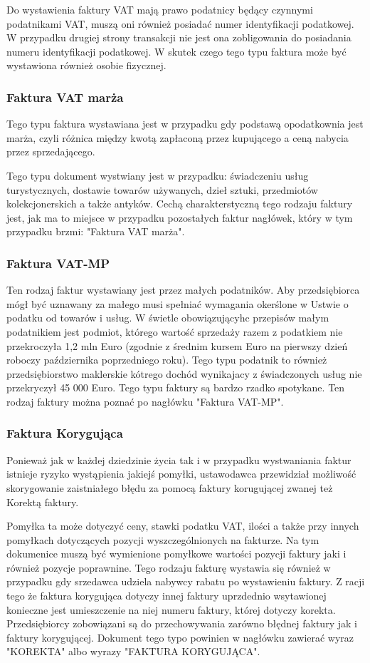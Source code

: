 \documentclass[12pt, a4paper]{article}
\begin{document}
Do wystawienia faktury VAT mają prawo podatnicy będący czynnymi podatnikami VAT,
muszą oni również posiadać numer identyfikacji podatkowej. W przypadku drugiej
strony transakcji nie jest ona zobligowania do posiadania numeru identyfikacji
podatkowej. W skutek czego tego typu faktura może być wystawiona również osobie
fizycznej.


\subsubsection{Faktura VAT marża}
Tego typu faktura wystawiana jest w przypadku gdy podstawą opodatkownia jest
marża, czyli różnica między kwotą zapłaconą przez kupującego a ceną nabycia
przez sprzedającego.


Tego typu dokument wystwiany jest w przypadku: świadczeniu usług
turystycznych, dostawie towarów używanych, dzieł sztuki, przedmiotów
kolekcjonerskich a także antyków. Cechą charakterstyczną tego rodzaju faktury
jest, jak ma to miejsce w przypadku pozostałych faktur nagłówek, który w tym
przypadku brzmi: "Faktura VAT marża".
\subsubsection{Faktura VAT-MP}
Ten rodzaj faktur wystawiany jest przez małych podatników. Aby przedsiębiorca
mógł być uznawany za małego musi spełniać wymagania okerślone w Ustwie o
podatku od towarów i usług. W świetle obowiązującyhc przepisów małym
podatnikiem jest podmiot, którego wartość sprzedaży razem z podatkiem nie
przekroczyła 1,2 mln Euro (zgodnie z średnim kursem Euro na pierwszy dzień
roboczy października poprzedniego roku). Tego typu podatnik to również
przedsiębiorstwo maklerskie kótrego dochód wynikajacy z świadczonych usług nie
przekryczył 45 000 Euro. Tego typu faktury są bardzo rzadko spotykane. Ten
rodzaj faktury można poznać po nagłówku "Faktura VAT-MP".
\subsubsection{Faktura Korygująca}
Ponieważ jak w każdej dziedzinie życia tak i w przypadku wystwaniania faktur
istnieje ryzyko wystąpienia jakiejś pomyłki, ustawodawca przewidział możliwość
skorygowanie zaistniałego błędu za pomocą faktury korugującej zwanej też Korektą
faktury.


Pomyłka ta może dotyczyć ceny, stawki podatku VAT, ilości a także przy innych pomyłkach dotyczących
pozycji wyszczególnionych na fakturze. Na tym dokumenice muszą być wymienione
pomyłkowe wartości pozycji faktury jaki i również pozycje poprawnine. Tego
rodzaju fakturę wystawia się również w przypadku gdy srzedawca udziela nabywcy rabatu po wystawieniu faktury. Z racji tego że faktura korygująca dotyczy innej
faktury uprzdednio wsytawionej konieczne jest umieszczenie na niej numeru
faktury, której dotyczy korekta. Przedsiębiorcy zobowiązani są do przechowywania
zarówno błędnej faktury jak i faktury korygującej. Dokument tego typo powinien w
nagłówku zawierać wyraz "KOREKTA" albo wyrazy "FAKTURA KORYGUJĄCA".
\end{document}
